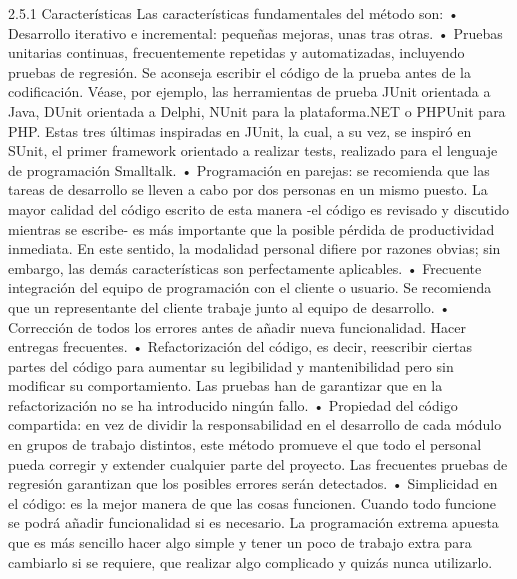 2.5.1	Características
Las características fundamentales del método son:
•	Desarrollo iterativo e incremental: pequeñas mejoras, unas tras otras.
•	Pruebas unitarias continuas, frecuentemente repetidas y automatizadas, incluyendo pruebas de regresión. Se aconseja escribir el código de la prueba antes de la codificación. Véase, por ejemplo, las herramientas de prueba JUnit orientada a Java, DUnit orientada a Delphi, NUnit para la plataforma.NET o PHPUnit para PHP. Estas tres últimas inspiradas en JUnit, la cual, a su vez, se inspiró en SUnit, el primer framework orientado a realizar tests, realizado para el lenguaje de programación Smalltalk.
•	Programación en parejas: se recomienda que las tareas de desarrollo se lleven a cabo por dos personas en un mismo puesto. La mayor calidad del código escrito de esta manera -el código es revisado y discutido mientras se escribe- es más importante que la posible pérdida de productividad inmediata. En este sentido, la modalidad personal difiere por razones obvias; sin embargo, las demás características son perfectamente aplicables.
•	Frecuente integración del equipo de programación con el cliente o usuario. Se recomienda que un representante del cliente trabaje junto al equipo de desarrollo.
•	Corrección de todos los errores antes de añadir nueva funcionalidad. Hacer entregas frecuentes.
•	Refactorización del código, es decir, reescribir ciertas partes del código para aumentar su legibilidad y mantenibilidad pero sin modificar su comportamiento. Las pruebas han de garantizar que en la refactorización no se ha introducido ningún fallo.
•	Propiedad del código compartida: en vez de dividir la responsabilidad en el desarrollo de cada módulo en grupos de trabajo distintos, este método promueve el que todo el personal pueda corregir y extender cualquier parte del proyecto. Las frecuentes pruebas de regresión garantizan que los posibles errores serán detectados.
•	Simplicidad en el código: es la mejor manera de que las cosas funcionen. Cuando todo funcione se podrá añadir funcionalidad si es necesario. La programación extrema apuesta que es más sencillo hacer algo simple y tener un poco de trabajo extra para cambiarlo si se requiere, que realizar algo complicado y quizás nunca utilizarlo.

